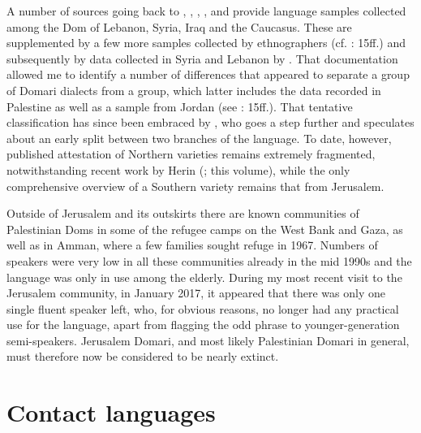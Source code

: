 \documentclass[output=paper]{langsci/langscibook}
\begin{document}
A number of sources going back to \citet{Pott1846}, \citet{Newbold1856}, \citet{Paspati1870}, \citet{Patkanoff1907}, and \citet{Black1913} provide language samples collected among the Dom of Lebanon, Syria, Iraq and the Caucasus. These are supplemented by a few more samples collected by ethnographers (cf. \citealt{Matras2012}: 15ff.) and subsequently by data collected in Syria and Lebanon by \citet{Herin2012}. That documentation allowed me to identify a number of differences that appeared to separate a  group of Domari dialects from a  group, which latter includes the data recorded in Palestine as well as a sample from Jordan (see \citealt{Matras2012}: 15ff.). That tentative classification has since been embraced by \citet{Herin2014Domari}, who goes a step further and speculates about an early split between two branches of the language. To date, however, published attestation of {Northern} varieties remains extremely fragmented, notwithstanding recent work by Herin (\citeyear{Herin2016}; this volume), while the only comprehensive overview of a {Southern} variety remains that from Jerusalem.

Outside of Jerusalem and its outskirts there are known communities of {Palestinian} Doms in some of the refugee camps on the West Bank and Gaza, as well as in Amman, where a few families sought refuge in 1967. Numbers of speakers were very low in all these communities already in the mid 1990s and the language was only in use among the elderly. During my most recent visit to the Jerusalem community, in  January 2017, it appeared that there was only one single fluent speaker left, who, for obvious reasons, no longer had any practical use for the language, apart from flagging the odd phrase to younger-generation semi-speakers. Jerusalem Domari, and most likely Palestinian Domari in general, must therefore now be considered to be nearly extinct.

\section{Contact languages}\label{sec2}
\end{document}
